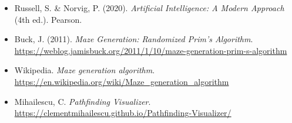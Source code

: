 \documentclass[12pt,a4paper]{article}
\begin{document}
\begin{itemize}
  \item Russell, S. \& Norvig, P. (2020). \textit{Artificial Intelligence:
        A Modern Approach} (4th ed.). Pearson.
  \item Buck, J. (2011). \textit{Maze Generation: Randomized Prim's Algorithm}.
        \url{https://weblog.jamisbuck.org/2011/1/10/maze-generation-prim-s-algorithm}
  \item Wikipedia. \textit{Maze generation algorithm}.
        \url{https://en.wikipedia.org/wiki/Maze_generation_algorithm}
  \item Mihailescu, C. \textit{Pathfinding Visualizer}.
        \url{https://clementmihailescu.github.io/Pathfinding-Visualizer/}
\end{itemize}
\end{document}
